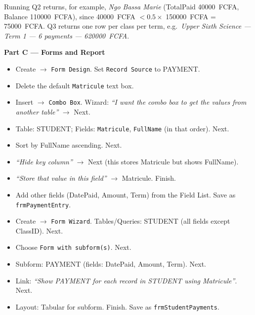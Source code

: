 \documentclass[11pt]{article}
\begin{document}
\begin{exemplebox}
Running Q2 returns, for example, \emph{Ngo Bassa Marie} (TotalPaid \SI{40000}{FCFA}, Balance \SI{110000}{FCFA}), since \SI{40000}{FCFA} $< 0.5 \times$ \SI{150000}{FCFA} = \SI{75000}{FCFA}. Q3 returns one row per class per term, e.g.\ \emph{Upper Sixth Science — Term 1 — 6 payments — \SI{620000}{FCFA}}.
\end{exemplebox}

\textbf{Part C — Forms and Report}

\begin{methode}
\begin{itemize}
\item Create $\rightarrow$ \texttt{Form Design}. Set \texttt{Record Source} to PAYMENT.
\item Delete the default \texttt{Matricule} text box.
\item Insert $\rightarrow$ \texttt{Combo Box}. Wizard: \emph{``I want the combo box to get the values from another table''} $\rightarrow$ Next.
\item Table: STUDENT; Fields: \texttt{Matricule}, \texttt{FullName} (in that order). Next.
\item Sort by FullName ascending. Next.
\item \emph{``Hide key column''} $\rightarrow$ Next (this stores Matricule but shows FullName).
\item \emph{``Store that value in this field''} $\rightarrow$ Matricule. Finish.
\item Add other fields (DatePaid, Amount, Term) from the Field List. Save as \texttt{frmPaymentEntry}.
\end{itemize}
\end{methode}

\begin{methode}
\begin{itemize}
\item Create $\rightarrow$ \texttt{Form Wizard}. Tables/Queries: STUDENT (all fields except ClassID). Next.
\item Choose \texttt{Form with subform(s)}. Next.
\item Subform: PAYMENT (fields: DatePaid, Amount, Term). Next.
\item Link: \emph{``Show PAYMENT for each record in STUDENT using Matricule''}. Next.
\item Layout: Tabular for subform. Finish. Save as \texttt{frmStudentPayments}.
\end{itemize}
\end{methode}
\end{document}
